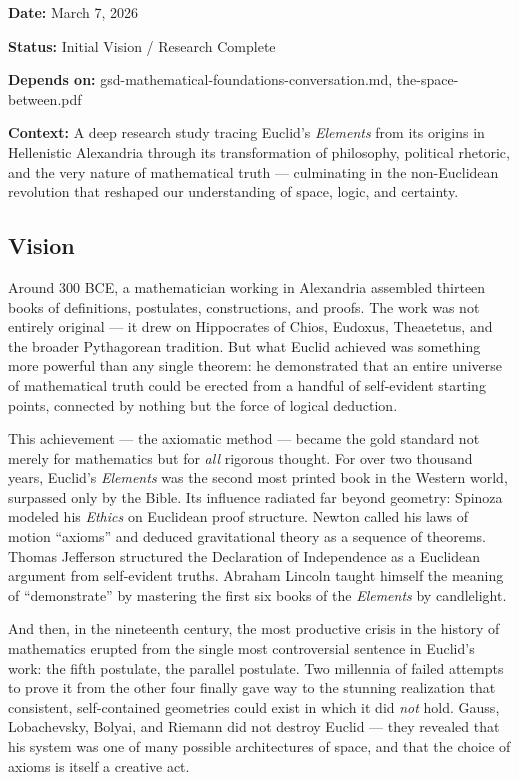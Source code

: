 \documentclass[11pt,letterpaper]{article}
\newcommand{\metafield}[2]{\textbf{\sffamily #1} #2\par}
\begin{document}
\metafield{Date:}{March 7, 2026}
\metafield{Status:}{Initial Vision / Research Complete}
\metafield{Depends on:}{gsd-mathematical-foundations-conversation.md, the-space-between.pdf}
\metafield{Context:}{A deep research study tracing Euclid's \textit{Elements} from its origins in Hellenistic Alexandria through its transformation of philosophy, political rhetoric, and the very nature of mathematical truth --- culminating in the non-Euclidean revolution that reshaped our understanding of space, logic, and certainty.}

\subsection{Vision}

Around 300 BCE, a mathematician working in Alexandria assembled thirteen books of definitions, postulates, constructions, and proofs. The work was not entirely original --- it drew on Hippocrates of Chios, Eudoxus, Theaetetus, and the broader Pythagorean tradition. But what Euclid achieved was something more powerful than any single theorem: he demonstrated that an entire universe of mathematical truth could be erected from a handful of self-evident starting points, connected by nothing but the force of logical deduction.

This achievement --- the axiomatic method --- became the gold standard not merely for mathematics but for \textit{all} rigorous thought. For over two thousand years, Euclid's \textit{Elements} was the second most printed book in the Western world, surpassed only by the Bible. Its influence radiated far beyond geometry: Spinoza modeled his \textit{Ethics} on Euclidean proof structure. Newton called his laws of motion ``axioms'' and deduced gravitational theory as a sequence of theorems. Thomas Jefferson structured the Declaration of Independence as a Euclidean argument from self-evident truths. Abraham Lincoln taught himself the meaning of ``demonstrate'' by mastering the first six books of the \textit{Elements} by candlelight.

And then, in the nineteenth century, the most productive crisis in the history of mathematics erupted from the single most controversial sentence in Euclid's work: the fifth postulate, the parallel postulate. Two millennia of failed attempts to prove it from the other four finally gave way to the stunning realization that consistent, self-contained geometries could exist in which it did \textit{not} hold. Gauss, Lobachevsky, Bolyai, and Riemann did not destroy Euclid --- they revealed that his system was one of many possible architectures of space, and that the choice of axioms is itself a creative act.
\end{document}
